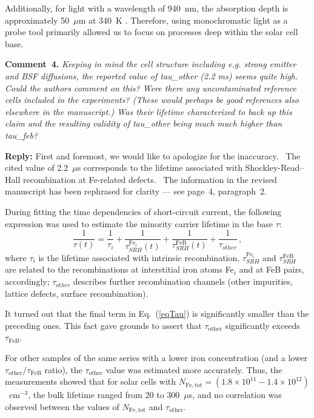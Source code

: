 \documentclass{WileyMSP-template}
\begin{document}
Additionally, for light with a wavelength of 940~nm, the absorption depth is approximately 50~$\mu$m at 340~K \cite{Green2022}.
Therefore, using monochromatic light as a probe tool primarily allowed us to focus on processes deep within the solar cell base.


\vspace{1cm}
\noindent
\textcolor[rgb]{0.00,0.50,1.00}{\textbf{Comment~4.}}
\emph{Keeping in mind the cell structure including e.g. strong emitter and BSF diffusions,
the reported value of tau\_other (2.2 ms) seems quite high.
Could the authors comment on this?
Were there any uncontaminated reference cells included in the experiments?
(These would perhaps be good references also elsewhere in the manuscript.)
Was their lifetime characterized to back up this claim and the resulting validity of tau\_other being much much higher than tau\_feb?
}


\noindent
\textcolor[rgb]{0.51,0.00,0.00}{\textbf{Reply:}}
First and foremost, we would like to apologize for the inaccuracy. 
The cited value of 2.2~$\mu$s corresponds to the lifetime associated with Shockley-Read–Hall recombination at Fe-related defects. 
The information in the revised manuscript has been rephrased for clarity --- see page~4, paragraph~2.

During fitting the time dependencies of short-circuit current,
the following expression was used to estimate the minority carrier lifetime in the base $\tau$:
\begin{equation}
\label{eqTau}
\frac{1}{\tau(t)}=\frac{1}{\tau_i}+\frac{1}{\tau_{SRH}^{\mathrm{Fe_i}}(t)}
+\frac{1}{\tau_{SRH}^\mathrm{FeB}(t)}+\frac{1}{\tau_{other}}\,,
\end{equation}
where
$\tau_i$ is the lifetime associated with intrinsic recombination,
$\tau_{SRH}^{\mathrm{Fe_i}}$ and $\tau_{SRH}^\mathrm{FeB}$ are related to the recombinations at interstitial iron atoms Fe$_i$ and at FeB pairs, accordingly;
$\tau_{other}$ describes further recombination channels
(other impurities, lattice defects, surface recombination).

It turned out that the final term in Eq.~(\ref{eqTau}) is significantly smaller than the preceding ones.
This fact gave grounds to assert that $\tau_\mathrm{other}$ significantly exceeds $\tau_\mathrm{FeB}$.

For other samples of the same series with a lower iron concentration (and a lower $\tau_\mathrm{other}/\tau_\mathrm{FeB}$ ratio),
the $\tau_\mathrm{other}$  value was estimated more accurately.
Thus, the measurements showed that for solar cells with
$N_\mathrm{Fe,tot}=(1.8\times10^{11}-1.4\times10^{12})$~cm$^{-3}$,
the bulk lifetime ranged from 20 to 300~$\mu$s,
and no correlation was observed between the values of $N_\mathrm{Fe,tot}$ and $\tau_\mathrm{other}$.
\end{document}
